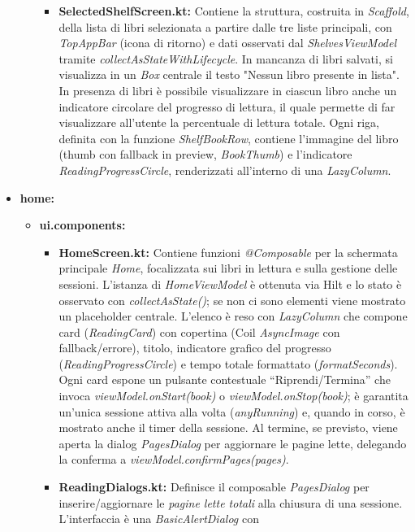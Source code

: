 \documentclass{article}
\begin{document}
\begin{itemize}
\begin{itemize}
\begin{itemize}
      \item \textbf{SelectedShelfScreen.kt:} Contiene la struttura, costruita in \textit{Scaffold}, della lista di libri selezionata a partire dalle tre liste principali, con \textit{TopAppBar} (icona di ritorno) e dati osservati dal \textit{ShelvesViewModel} 
      tramite \textit{collectAsStateWithLifecycle}. In mancanza di libri salvati, si visualizza in un \textit{Box} centrale il testo "Nessun libro presente in lista". In presenza di libri è possibile visualizzare in ciascun libro anche un indicatore circolare 
      del progresso di lettura, il quale permette di far visualizzare all'utente la percentuale di lettura totale. Ogni riga, definita con la funzione \textit{ShelfBookRow}, contiene l'immagine del libro (thumb con fallback in preview, \textit{BookThumb}) 
      e l’indicatore \textit{ReadingProgressCircle}, renderizzati all’interno di una \textit{LazyColumn}.
    \end{itemize}
  \end{itemize}
  \item \textbf{home:}
  \begin{itemize}
    \item \textbf{ui.components:}
    \begin{itemize}
      \item \textbf{HomeScreen.kt:} Contiene funzioni \textit{@Composable} per la schermata principale \emph{Home}, focalizzata sui libri in lettura e sulla gestione delle sessioni. 
      L’istanza di \textit{HomeViewModel} è ottenuta via Hilt e lo stato è osservato con \textit{collectAsState()}; se non ci sono elementi viene mostrato un placeholder centrale. L’elenco è reso con \textit{LazyColumn} che compone card 
      (\textit{ReadingCard}) con copertina (Coil \textit{AsyncImage} con fallback/errore), titolo, indicatore grafico del progresso (\textit{ReadingProgressCircle}) e tempo totale formattato (\textit{formatSeconds}). Ogni card espone un pulsante contestuale “Riprendi/Termina” che invoca \textit{viewModel.onStart(book)} o \textit{viewModel.onStop(book)}; 
      è garantita un’unica sessione attiva alla volta (\textit{anyRunning}) e, quando in corso, è mostrato anche il timer della sessione. Al termine, se previsto, viene aperta la dialog \textit{PagesDialog} per aggiornare le pagine lette, delegando la conferma a \textit{viewModel.confirmPages(pages)}.
      \item \textbf{ReadingDialogs.kt:} Definisce il composable \textit{PagesDialog} per inserire/aggiornare le 
      \emph{pagine lette totali} alla chiusura di una sessione. L’interfaccia è una \textit{BasicAlertDialog} con 

\end{itemize}
\end{itemize}
\end{itemize}
\end{document}
